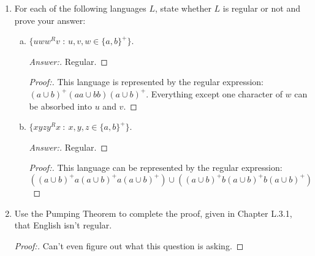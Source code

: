 \documentclass[10pt]{article}
\begin{document}
\begin{enumerate}[1)]
\begin{enumerate}[a)]
\item
* $\{w: w \in \{a – z\}^*$ and the letters of $w$ appear in reverse alphabetical order\}.  For example, \texttt{spoonfeed} $\in L$.
\begin{proof}[Answer:]
Regular.
\end{proof}
\begin{proof}[Proof:]
Big honkin fsm with one state for each letter from z to a and one transition from each state to all subsequent states.
\end{proof}

\item
$L_0^*$, where $L_0 = \{ba^ib^ja^k,\ j \geq 0,\ 0 \leq i \leq k\}$.
\begin{proof}[Answer:]
Regular.
\end{proof}
\begin{proof}[Proof:]
$L_0^*$ is represented by the regular expression $(ba^*)^*$
\end{proof}
\end{enumerate}


\item
For each of the following languages $L$, state whether $L$ is regular or not and prove your answer:
\begin{enumerate}[a)]
\item
$\{uww^Rv$ : $u, v, w \in \{a, b\}^+\}$.
\begin{proof}[Answer:]
Regular.
\end{proof}
\begin{proof}[Proof:]
This language is represented by the regular expression: $(a \cup b)^+(aa \cup bb)(a \cup b)^+$.  Everything except one character of $w$ can be absorbed into $u$ and $v$.
\end{proof}

\item
$\{xyzy^Rx\ :\ x, y, z \in \{a, b\}^+\}$.
\begin{proof}[Answer:]
Regular.
\end{proof}
\begin{proof}[Proof:]
This language can be represented by the regular expression: \\$((a \cup b)^+a(a \cup b)^+a(a \cup b)^+) \cup ((a \cup b)^+b(a \cup b)^+b(a \cup b)^+)$
\end{proof}
\end{enumerate}



\item
Use the Pumping Theorem to complete the proof, given in Chapter L.3.1, that English isn’t regular.
\begin{proof}[Proof:]
Can't even figure out what this question is asking.
\end{proof}


\end{enumerate}
\end{document}
